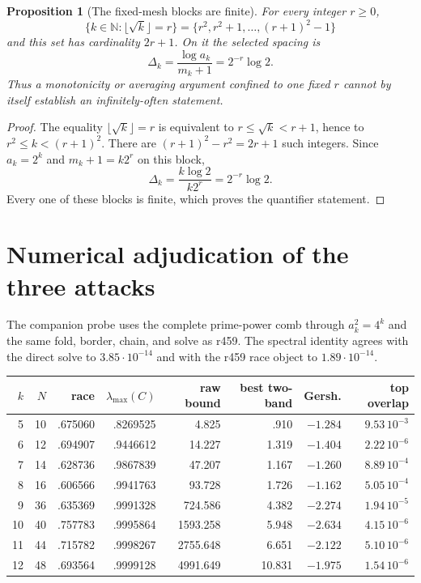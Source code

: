 \documentclass[11pt]{article}
\newtheorem{proposition}{Proposition}
\theoremstyle{remark}
\begin{document}
\begin{proposition}[The fixed-mesh blocks are finite]\label{prop:block}
For every integer $r\ge0$,
\[
\{k\in\mathbb N:\lfloor\sqrt{k}\rfloor=r\}
=\{r^2,r^2+1,\ldots,(r+1)^2-1\}
\]
and this set has cardinality $2r+1$.
On it the selected spacing is
\[
\Delta_k=\frac{\log a_k}{m_k+1}
=2^{-r}\log2.
\]
Thus a monotonicity or averaging argument confined to one fixed
$r$ cannot by itself establish an infinitely-often statement.
\end{proposition}

\begin{proof}
The equality $\lfloor\sqrt{k}\rfloor=r$ is equivalent to
$r\le\sqrt{k}<r+1$, hence to
$r^2\le k<(r+1)^2$.  There are
$(r+1)^2-r^2=2r+1$ such integers.
Since $a_k=2^k$ and $m_k+1=k2^r$ on this block,
\[
\Delta_k=\frac{k\log2}{k2^r}=2^{-r}\log2.
\]
Every one of these blocks is finite, which proves the quantifier
statement.
\end{proof}

\section{Numerical adjudication of the three attacks}

The companion probe uses the complete prime-power comb through
$a_k^2=4^k$ and the same fold, border, chain, and solve as r459.
The spectral identity agrees with the direct solve to
$3.85\cdot10^{-14}$ and with the r459 race object to
$1.89\cdot10^{-14}$.

\begin{center}
\small
\begin{tabular}{@{}rrrrrrrr@{}}
\toprule
$k$ & $N$ & race & $\lambda_{\max}(C)$ &
raw bound & best two-band & Gersh. & top overlap\\
\midrule
5  & 10 & .675060 & .8269525 & 4.825 & .910 & $-1.284$ & $9.53\,10^{-3}$\\
6  & 12 & .694907 & .9446612 & 14.227 & 1.319 & $-1.404$ & $2.22\,10^{-6}$\\
7  & 14 & .628736 & .9867839 & 47.207 & 1.167 & $-1.260$ & $8.89\,10^{-4}$\\
8  & 16 & .606566 & .9941763 & 93.728 & 1.726 & $-1.162$ & $5.05\,10^{-4}$\\
9  & 36 & .635369 & .9991328 & 724.586 & 4.382 & $-2.274$ & $1.94\,10^{-5}$\\
10 & 40 & .757783 & .9995864 & 1593.258 & 5.948 & $-2.634$ & $4.15\,10^{-6}$\\
11 & 44 & .715782 & .9998267 & 2755.648 & 6.651 & $-2.122$ & $5.10\,10^{-6}$\\
12 & 48 & .693564 & .9999128 & 4991.649 & 10.831 & $-1.975$ & $1.54\,10^{-6}$\\
\bottomrule
\end{tabular}
\end{center}
\end{document}
